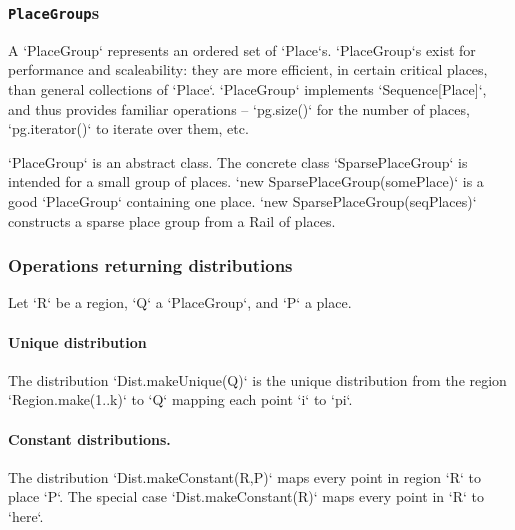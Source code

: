 \subsubsection{{\tt PlaceGroup}s}

A \xcd`PlaceGroup` represents an ordered set of \xcd`Place`s.
\xcd`PlaceGroup`s exist for performance and scaleability: they are more
efficient, in certain critical places, than general collections of
\xcd`Place`. \xcd`PlaceGroup` implements \xcd`Sequence[Place]`, and thus
provides familiar operations -- \xcd`pg.size()` for the number of places,
\xcd`pg.iterator()` to iterate over them, etc.  

\xcd`PlaceGroup` is an abstract class.  The concrete class
\xcd`SparsePlaceGroup` is intended for a small group of places. 
\xcd`new SparsePlaceGroup(somePlace)` is a good \xcd`PlaceGroup` containing
one place.  
\xcd`new SparsePlaceGroup(seqPlaces)`
constructs a sparse place group from a Rail of places.

\subsubsection{Operations returning distributions}



Let \xcd`R` be a region, \xcd`Q` 
a \xcd`PlaceGroup`, and \xcd`P` a place.

\paragraph{Unique distribution} 
The distribution \xcd`Dist.makeUnique(Q)` is the unique distribution from the
region \xcd`Region.make(1..k)` to \xcd`Q` mapping each point \xcd`i` to
\xcd`pi`.


\paragraph{Constant distributions.} 
The distribution \xcd`Dist.makeConstant(R,P)` maps every point in region
\xcd`R` to place \xcd`P`.  
The special case \xcd`Dist.makeConstant(R)` maps every point in \xcd`R` to
\xcd`here`. 

